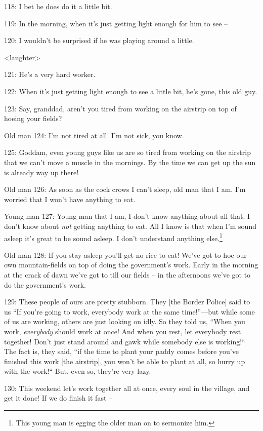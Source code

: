 118: I bet he does do it a little bit.

119: In the morning, when it's just getting light enough for him to see --

120: I wouldn't be surprised if he was playing around a little.

<laughter>

121: He's a very hard worker.

122: When it's just getting light enough to see a little bit, he's gone, this old
guy.

123: Say, granddad, aren't you tired from working on the airstrip on top of hoeing
your fields?

Old man 124: I'm not tired at all. I'm not sick, you know.

125: Goddam, even young guys like us are so tired from working on the airstrip
that we can't move a muscle in the mornings. By the time we can get up the sun
is already way up there!

Old man 126: As soon as the cock crows I can't sleep, old man that I am. I'm worried
that I won't have anything to eat.

Young man 127: Young man that I am, I don't know anything about all that. I don't
know about \textit{not} getting anything to eat. All I know is that when I'm sound
asleep it's great to be sound asleep. I don't understand anything else.\footnote{This young man is egging the older man on to sermonize him.}

Old man 128: If you stay asleep you'll get no rice to eat! We've got to hoe our
own mountain-fields on top of doing the government's work. Early in the morning
at the crack of dawn we've got to till our fields -- in the afternoons we've got
to do the government's work.

129: These people of ours are pretty stubborn. They [the Border Police] said to
us ``If you're going to work, everybody work at the same time!''---but
while some of us are working, others are just looking on idly. So they told us,
``When you work, \textit{everybody} should work at once! And when you rest,
let everybody rest together! Don't just stand around and gawk while somebody else
is working!`` The fact is, they said, ``if the time to plant your
paddy comes before you've finished this work [the airstrip], you won't be able
to plant at all, so hurry up with the work!`` But, even so, they're very
lazy.

130: This weekend let's work together all at once, every soul in the village, and
get it done! If we do finish it fast --

